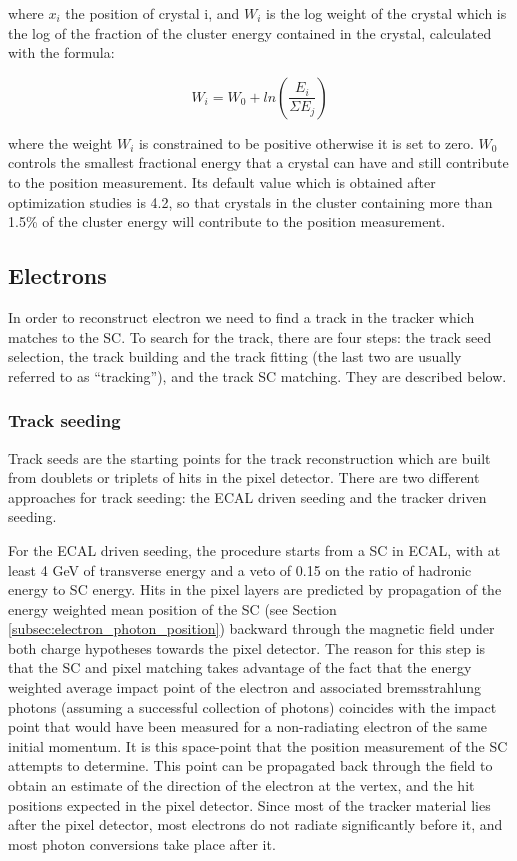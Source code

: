 where $x_{i}$ the position of crystal i, and $W_{i}$ is the log weight of the crystal which is the log of the fraction of the cluster energy contained in the crystal, calculated with the formula:

\begin{equation}
W_{i}=W_{0}+ln(\frac{E_{i}}{\Sigma E_{j}})
\label{eq:log_fraction}
\end{equation}

where the weight $W_{i}$ is constrained to be positive otherwise it is set to zero. $W_{0}$ controls the smallest fractional energy that a crystal can have and still contribute to the position measurement. Its default value which is obtained after optimization studies is 4.2, so that crystals in the cluster containing
more than 1.5\% of the cluster energy will contribute to the position measurement.

\subsection{Electrons}\label{subsec:electron_reco}
In order to reconstruct electron we need to find a track in the tracker which matches to the SC. To search for the track, there are four steps: the track seed selection, the track building and the track fitting (the last two are usually referred to as ``tracking''), and the track SC matching. They are described below.

\subsubsection*{Track seeding}\label{subsec:track_seeding}
Track seeds are the starting points for the track reconstruction which are built from doublets or triplets of hits in the pixel detector. There are two
different approaches for track seeding: the ECAL driven seeding and the tracker driven seeding.

For the ECAL driven seeding, the procedure starts from a SC in ECAL, with at least 4 GeV of transverse energy and a veto of 0.15 on the ratio of hadronic energy to SC energy. Hits in the pixel layers are predicted by propagation of the energy weighted mean position of the SC (see Section \ref{subsec:electron_photon_position}) backward through the magnetic field under both charge hypotheses towards the pixel detector. The reason for this step is that the SC and pixel matching takes advantage of the fact that the energy weighted average impact point of the electron and associated bremsstrahlung photons (assuming a successful collection of photons) coincides with the impact point that would have been measured for a non-radiating electron of the same initial momentum. It is this space-point that the position measurement of the SC attempts to determine. This point can be propagated back through the field to obtain an estimate of the direction of the electron at the vertex, and the hit positions expected in the pixel detector. Since most of the tracker material lies after the pixel detector, most electrons do not radiate significantly before it, and most photon conversions take place after it.


